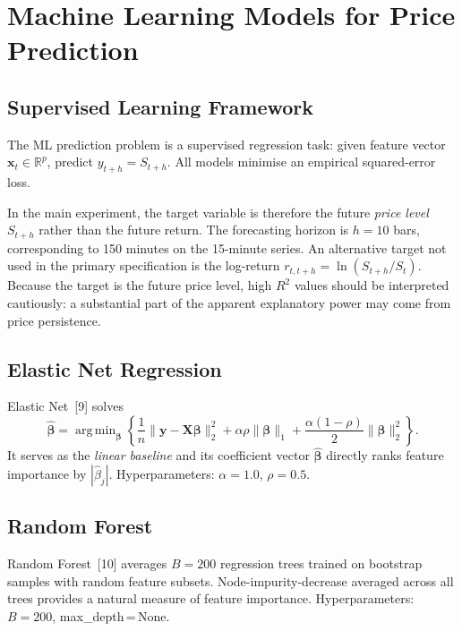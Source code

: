 \documentclass[12pt, a4paper, oneside]{report}
\theoremstyle{plain}
\theoremstyle{definition}
\theoremstyle{remark}
\newcommand{\R}{\mathbb{R}}
\DeclareMathOperator*{\argmin}{arg\,min}
\begin{document}
\chapter{Machine Learning Models for Price Prediction}
\label{ch:ml_models}

\section{Supervised Learning Framework}

The ML prediction problem is a supervised regression task: given feature
vector $\mathbf{x}_t \in \R^p$, predict $y_{t+h} = S_{t+h}$.  All models
minimise an empirical squared-error loss.

In the main experiment, the target variable is therefore the future \emph{price
level} $S_{t+h}$ rather than the future return.  The forecasting horizon is
$h = 10$ bars, corresponding to 150 minutes on the 15-minute series.  An
alternative target not used in the primary specification is the log-return
$r_{t,t+h} = \ln(S_{t+h}/S_t)$.  Because the target is the future price level,
high $R^2$ values should be interpreted cautiously: a substantial part of the
apparent explanatory power may come from price persistence.

\section{Elastic Net Regression}

Elastic Net~[9] solves
\begin{equation}
\label{eq:enet}
  \hat{\bm\beta} = \argmin_{\bm\beta}
  \left\{
    \frac{1}{n}\|\mathbf{y} - \mathbf{X}\bm\beta\|_2^2
    + \alpha\rho\|\bm\beta\|_1
    + \frac{\alpha(1-\rho)}{2}\|\bm\beta\|_2^2
  \right\}.
\end{equation}
It serves as the \emph{linear baseline} and its coefficient vector $\hat{\bm\beta}$
directly ranks feature importance by $|\hat\beta_j|$.  Hyperparameters:
$\alpha = 1.0$, $\rho = 0.5$.

\section{Random Forest}

Random Forest~[10] averages $B = 200$ regression trees trained on bootstrap
samples with random feature subsets.  Node-impurity-decrease averaged across
all trees provides a natural measure of feature importance.
Hyperparameters: $B = 200$, max\_depth\,=\,None.
\end{document}
